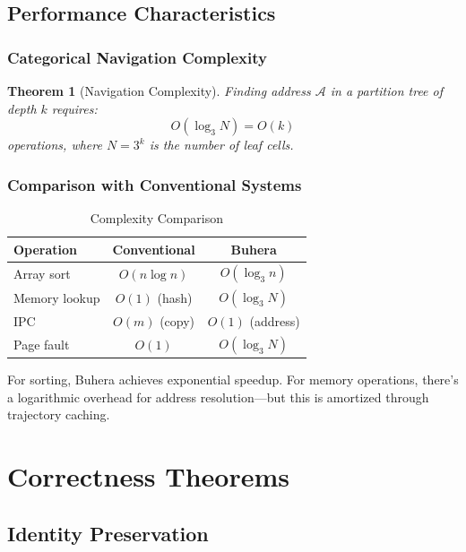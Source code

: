 \documentclass[twocolumn,10pt]{article}
\newtheorem{theorem}{Theorem}[section]
\theoremstyle{definition}
\theoremstyle{remark}
\newcommand{\cataddr}{\mathcal{A}}
\begin{document}
\subsection{Performance Characteristics}

\subsubsection{Categorical Navigation Complexity}

\begin{theorem}[Navigation Complexity]
Finding address $\cataddr$ in a partition tree of depth $k$ requires:
\begin{equation}
    O(\log_3 N) = O(k)
\end{equation}
operations, where $N = 3^k$ is the number of leaf cells.
\end{theorem}

\subsubsection{Comparison with Conventional Systems}

\begin{table}[h]
\centering
\caption{Complexity Comparison}
\begin{tabular}{lcc}
\toprule
Operation & Conventional & Buhera \\
\midrule
Array sort & $O(n \log n)$ & $O(\log_3 n)$ \\
Memory lookup & $O(1)$ (hash) & $O(\log_3 N)$ \\
IPC & $O(m)$ (copy) & $O(1)$ (address) \\
Page fault & $O(1)$ & $O(\log_3 N)$ \\
\bottomrule
\end{tabular}
\end{table}

For sorting, Buhera achieves exponential speedup. For memory operations, there's a logarithmic overhead for address resolution—but this is amortized through trajectory caching.

\section{Correctness Theorems}
\label{sec:correctness}

\subsection{Identity Preservation}
\end{document}
